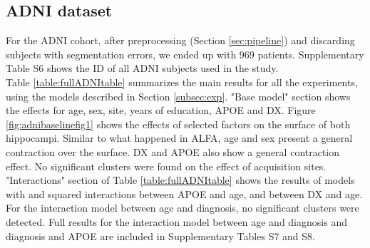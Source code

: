 \subsection{ADNI dataset}

For the ADNI cohort, after preprocessing (Section \ref{sec:pipeline}) and discarding subjects with segmentation errors, we ended up with 969 patients. Supplementary Table S6 shows the ID of all ADNI subjects used in the study. \\

Table \ref{table:fullADNItable} summarizes the main results for all the experiments, using the models described in Section \ref{subsec:exp}. "Base model" section shows the effects for age, sex, site, years of education, APOE and DX. Figure \ref{fig:adnibaselinefig1} shows the effects of selected factors on the surface of both hippocampi. Similar to what happened in ALFA, age and sex present a general contraction over the surface. DX and APOE also show a general contraction effect. No significant clusters were found on the effect of acquisition sites. "Interactions" section of Table \ref{table:fullADNItable} shows the results of models with and squared interactions between APOE and age, and between DX and age. For the interaction model between age and diagnosis, no significant clusters were detected. Full results for the interaction model between age and diagnosis and diagnosis and APOE are included in Supplementary Tables S7 and S8. \\


